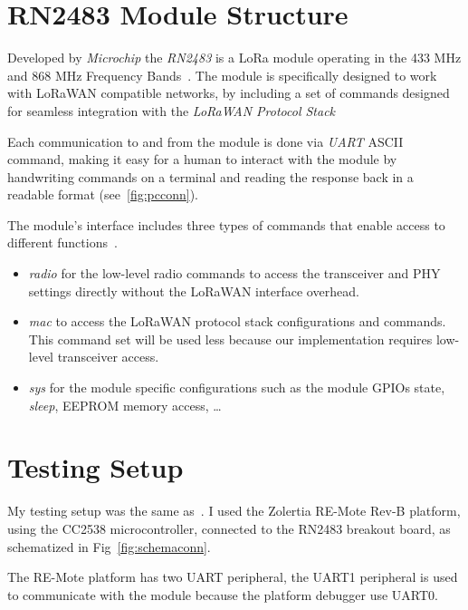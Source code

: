 \section{RN2483 Module Structure}

Developed by \emph{Microchip} the \emph{RN2483} is a LoRa module operating in
the 433 MHz and 868 MHz Frequency Bands~\cite{microchip:rn2483}. 
The module is specifically designed to work with LoRaWAN compatible networks, 
by including a set of commands designed for seamless integration with the
\emph{LoRaWAN Protocol Stack}

Each communication to and from the module is done via \emph{UART} ASCII command,
making it easy for a human to interact with the module by handwriting commands
on a terminal and reading the response back in a readable format
(see~\ref{fig:pcconn}).



The module's interface includes three types of commands that enable access to
different functions~\cite{microchip:reference}.

\begin{itemize}
  \item \emph{radio} for the low-level radio commands to access the transceiver
    and PHY settings directly without the LoRaWAN interface overhead.
  \item \emph{mac} to access the LoRaWAN protocol stack configurations and
    commands. This command set will be used less because our implementation
    requires low-level transceiver access.
  \item \emph{sys} for the module specific configurations such as the module
    GPIOs state, \emph{sleep}, EEPROM memory access, \ldots
\end{itemize}

\section{Testing Setup}

My testing setup was the same as~\cite{8847137}. I used the Zolertia RE-Mote
Rev-B platform, using the CC2538 microcontroller, connected to the
RN2483 breakout board, as schematized in Fig~\ref{fig:schemaconn}. 

The RE-Mote platform has two UART peripheral, the UART1 peripheral is used
to communicate with the module because the platform debugger use UART0.

